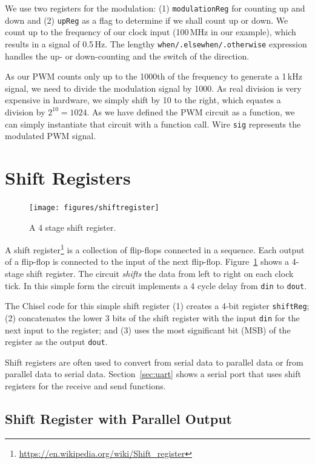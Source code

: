 \documentclass[%
    10pt,
    headinclude, footexclude,
    openright, %
    notitlepage,
    cleardoubleempty,
    headsepline,
    pointlessnumbers,
    bibtotoc, idxtotoc,
    ]{scrbook}
\newcommand{\code}[1]{{\lstinline[basicstyle=\small\ttfamily]{#1}}}
\newcommand{\myref}[2]{\href{#1}{#2}}
\renewcommand{\myref}[2]{{#2}{\footnote{\url{#1}}}}
\begin{document}
We use two registers for the modulation: (1) \code{modulationReg} for counting up and down
and (2) \code{upReg} as a flag to determine if we shall count up or down. We count up
to the frequency of our clock input (100\,MHz in our example), which results in a signal
of 0.5\,Hz. The lengthy \code{when/.elsewhen/.otherwise} expression handles the up- or
down-counting and the switch of the direction.

As our PWM counts only up to the 1000th of the frequency to generate a 1\,kHz signal,
we need to divide the modulation signal by 1000. As real division is very expensive in hardware,
we simply shift by 10 to the right, which equates a division by $2^{10} = 1024$.
As we have defined the PWM circuit as a function, we can simply instantiate that circuit
with a function call. Wire \code{sig} represents the modulated PWM signal.

\section{Shift Registers}

\begin{figure}
  \centering
  \texttt{[image: figures/shiftregister]}
  \caption{A 4 stage shift register.}
  \label{fig:shiftregister}
\end{figure}


A \myref{https://en.wikipedia.org/wiki/Shift_register}{shift register} is a collection of flip-flops
connected in a sequence. Each output of a flip-flop is connected to the input of the
next flip-flop. Figure~\ref{fig:shiftregister} shows a 4-stage shift register.
The circuit \emph{shifts} the data from left to right on each clock tick. In this simple form the
circuit implements a 4 cycle delay from \code{din} to \code{dout}.

The Chisel code for this simple shift register (1) creates a 4-bit register \code{shiftReg};
(2) concatenates the lower 3 bits of the shift register with the input \code{din} for the next
input to the register; and (3) uses the most significant bit (MSB) of the register as the output \code{dout}.


Shift registers are often used to convert from serial data to parallel data or from parallel data
to serial data. Section~\ref{sec:uart} shows a serial port that uses shift registers for the receive and
send functions.

\subsection{Shift Register with Parallel Output}
\end{document}
